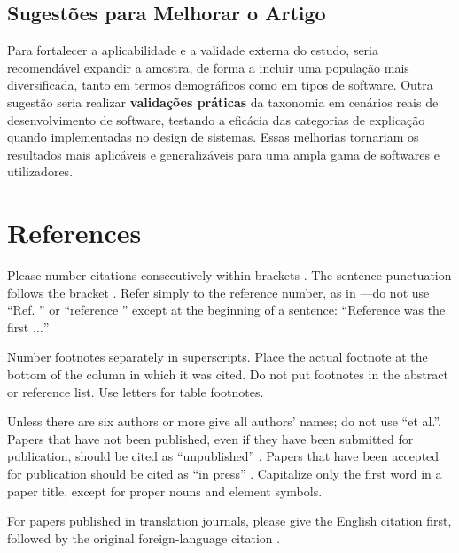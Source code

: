 \documentclass[conference]{IEEEtran}
\begin{document}
\subsection*{Sugestões para Melhorar o Artigo}
Para fortalecer a aplicabilidade e a validade externa do estudo, seria recomendável expandir a amostra, de forma a incluir uma população mais diversificada, tanto em termos demográficos como em tipos de software. Outra sugestão seria realizar \textbf{validações práticas} da taxonomia em cenários reais de desenvolvimento de software, testando a eficácia das categorias de explicação quando implementadas no design de sistemas. Essas melhorias tornariam os resultados mais aplicáveis e generalizáveis para uma ampla gama de softwares e utilizadores.

\section*{References}

Please number citations consecutively within brackets \cite{b1}. The 
sentence punctuation follows the bracket \cite{b2}. Refer simply to the reference 
number, as in \cite{b3}---do not use ``Ref. \cite{b3}'' or ``reference \cite{b3}'' except at 
the beginning of a sentence: ``Reference \cite{b3} was the first $\ldots$''

Number footnotes separately in superscripts. Place the actual footnote at 
the bottom of the column in which it was cited. Do not put footnotes in the 
abstract or reference list. Use letters for table footnotes.

Unless there are six authors or more give all authors' names; do not use 
``et al.''. Papers that have not been published, even if they have been 
submitted for publication, should be cited as ``unpublished'' \cite{b4}. Papers 
that have been accepted for publication should be cited as ``in press'' \cite{b5}. 
Capitalize only the first word in a paper title, except for proper nouns and 
element symbols.

For papers published in translation journals, please give the English 
citation first, followed by the original foreign-language citation \cite{b6}.
\end{document}
